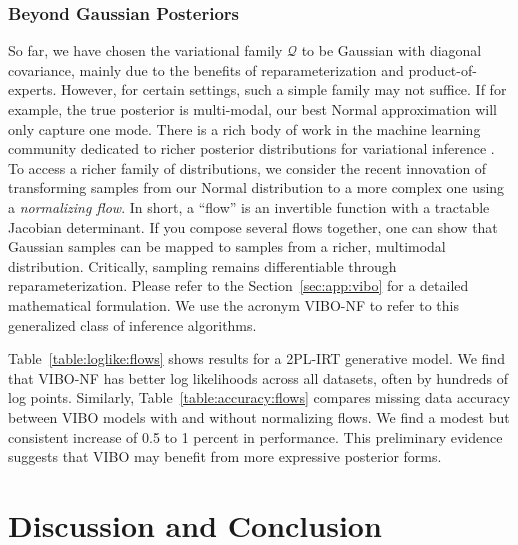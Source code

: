 \subsubsection{Beyond Gaussian Posteriors}
So far, we have chosen the variational family $\mathcal{Q}$ to be Gaussian with diagonal covariance, mainly due to the benefits of reparameterization and product-of-experts.
However, for certain settings, such a simple family may not suffice.
If for example, the true posterior is multi-modal, our best Normal approximation will only capture one mode.
There is a rich body of work in the machine learning community dedicated to richer posterior distributions for variational inference \cite{rezende2014stochastic,tomczak2016improving,berg2018sylvester,kingma2016improved}.
To access a richer family of distributions, we consider the recent innovation of transforming samples from our Normal distribution to a more complex one using a \emph{normalizing flow}. 
In short, a ``flow'' is an invertible function with a tractable Jacobian determinant. 
If you compose several flows together, one can show that Gaussian samples can be mapped to samples from a richer, multimodal distribution. 
Critically, sampling remains differentiable through reparameterization.
Please refer to the Section~\ref{sec:app:vibo} for a detailed mathematical formulation.
We use the acronym VIBO-NF to refer to this generalized class of inference algorithms. 

Table~\ref{table:loglike:flows} shows results for a 2PL-IRT generative model. 
We find that VIBO-NF has better log likelihoods across all datasets, often by hundreds of log points.
Similarly, Table~\ref{table:accuracy:flows} compares missing data accuracy between VIBO models with and without normalizing flows. We find a modest but consistent increase of 0.5 to 1 percent in performance. 
This preliminary evidence suggests that VIBO may benefit from more expressive posterior forms.

\section{Discussion and Conclusion}

